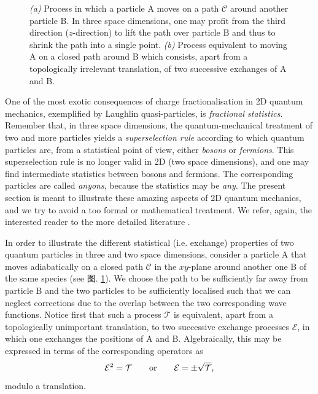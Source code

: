\documentclass[10pt]{book}
\newcommand{\Cmath}{\mathcal{C}}
\newcommand{\Tmath}{\mathcal{T}}
\newcommand{\Emath}{\mathcal{E}}
\newcommand{\beq}{\begin{equation}}
\newcommand{\eeq}{\end{equation}}
\begin{document}
\begin{figure}
\begin{center}
\end{center}
\caption{ {\sl (a)} Process in which a particle A moves on a path $\Cmath$ around another particle B. In three space dimensions, one
may profit from the third direction ($z$-direction) to lift the path over particle B and thus to shrink the path into a single point. 
{\sl (b)} Process equivalent to moving A on a closed path around B which consists, apart 
from a topologically irrelevant translation, of two successive exchanges of A and B.}
\label{fig22}
\end{figure}


One of the most exotic consequences of charge fractionalisation in 2D quantum mechanics, exemplified by Laughlin quasi-particles, 
is {\sl fractional statistics}. Remember that, in three space dimensions, the quantum-mechanical treatment of two and more particles yields
a {\sl superselection rule} according to which quantum particles are, from a statistical point of view, 
either {\sl bosons} or {\sl fermions}. 
This superselection rule is no longer valid in 2D (two space dimensions), and one may find intermediate
statistics between bosons and fermions. The corresponding particles are called {\sl anyons}, because the statistics may be {\sl any}.
The present section is meant to illustrate these amazing aspects of 2D quantum mechanics, and we try to avoid a too formal or
mathematical treatment. We refer, again, the interested reader to the more detailed literature \cite{nayak}.

In order to illustrate the different statistical (i.e. exchange) properties of two quantum particles in three and two space dimensions,
consider a particle A that moves adiabatically 
on a closed path $\Cmath$ in the $xy$-plane around another one B of the same species (see 图. \ref{fig22}).
We choose the path to be sufficiently far away from particle B and the 
two particles to be sufficiently localised such that we can neglect corrections due to the overlap
between the two corresponding wave functions. Notice first that such a process $\Tmath$ is equivalent, apart from a topologically
unimportant translation, to two successive exchange processes $\Emath$, in which one exchanges the positions of A and B.
Algebraically, this may be expressed in terms of the corresponding operators as
\beq\label{StatExch}
\Emath^2 = \Tmath \qquad {\rm or} \qquad \Emath = \pm \sqrt{\Tmath},
\eeq
modulo a translation. 
\end{document}
